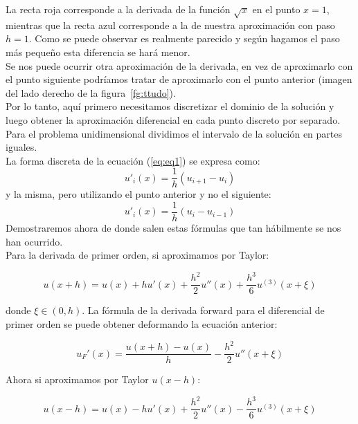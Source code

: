 \documentclass[12pt]{article}
\begin{document}
La recta roja corresponde a la derivada de la función $\sqrt{x}$ en el punto $x=1$,
mientras que la recta azul corresponde a la de nuestra aproximación con paso $h=1$.
Como se puede observar es realmente parecido y según hagamos el paso más pequeño 
esta diferencia se hará menor.\\

Se nos puede ocurrir otra aproximación de la derivada, en vez de aproximarlo con el punto siguiente podríamos tratar de aproximarlo con el punto anterior (imagen del lado derecho de la figura~\ref{fg:ttudo}).\\

Por lo tanto, aquí primero necesitamos discretizar el dominio de la solución y luego obtener la aproximación diferencial en cada punto discreto por separado. Para el problema unidimensional dividimos el intervalo de la solución en partes iguales.\\

La forma discreta de la ecuación (\ref{eq:eq1}) se expresa como: 								
\begin{equation}
u'_i(x)=\frac{1}{h}(u_{i+1} - u_i)
\end{equation}
y la misma, pero utilizando el punto anterior y no el siguiente:
\begin{equation}
u'_i(x)=\frac{1}{h}(u_i-u_{i-1})
\end{equation}
Demostraremos ahora de donde salen estas fórmulas que tan hábilmente se nos han ocurrido.\\

Para la derivada de primer orden, si aproximamos por Taylor:

\begin{equation*}
u(x+h)=u(x) + hu'(x)+ \frac{h^2}{2}  u''(x)+ \frac{h^3}{6} u^{(3)}(x+\xi) 
\end{equation*}

donde $\xi\in (0,h)$. La fórmula de la derivada forward para el diferencial de primer orden se puede obtener deformando la ecuación anterior:

\begin{equation*}
u_F'(x)=\frac{u(x+h)-u(x)}{h} - \frac{h^2}{2}u''(x+\xi)
\end{equation*}

Ahora si aproximamos por Taylor $u(x-h)$:

\begin{equation}
u(x-h)=u(x) - hu'(x)+ \frac{h^2}{2}  u''(x) - \frac{h^3}{6} u^{(3)}(x+\xi)
\end{equation}
\end{document}
